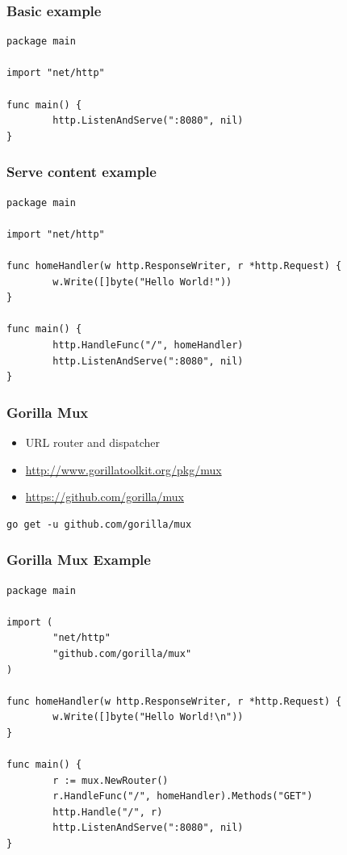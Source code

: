 \documentclass[aspectratio=169]{beamer}
\begin{document}
\begin{frame}[fragile]
  \frametitle{Basic example}

\begin{Verbatim}[fontsize=\small]
package main

import "net/http"

func main() {
        http.ListenAndServe(":8080", nil)
}
\end{Verbatim}

\end{frame}

\begin{frame}[fragile]
  \frametitle{Serve content example}

\begin{Verbatim}[fontsize=\small]
package main

import "net/http"

func homeHandler(w http.ResponseWriter, r *http.Request) {
        w.Write([]byte("Hello World!"))
}

func main() {
        http.HandleFunc("/", homeHandler)
        http.ListenAndServe(":8080", nil)
}
\end{Verbatim}

\end{frame}


\begin{frame}[fragile]
  \frametitle{Gorilla Mux}

  \begin{itemize}
  \item URL router and dispatcher
  \item \url{http://www.gorillatoolkit.org/pkg/mux}
  \item \url{https://github.com/gorilla/mux}
  \end{itemize}

\begin{Verbatim}[fontsize=\small]
go get -u github.com/gorilla/mux
\end{Verbatim}
  
\end{frame}


\begin{frame}[fragile]
  \frametitle{Gorilla Mux Example}

\begin{Verbatim}[fontsize=\small]
package main

import (
        "net/http"
        "github.com/gorilla/mux"
)

func homeHandler(w http.ResponseWriter, r *http.Request) {
        w.Write([]byte("Hello World!\n"))
}

func main() {
        r := mux.NewRouter()
        r.HandleFunc("/", homeHandler).Methods("GET")
        http.Handle("/", r)
        http.ListenAndServe(":8080", nil)
}
\end{Verbatim}
  
\end{frame}
\end{document}
